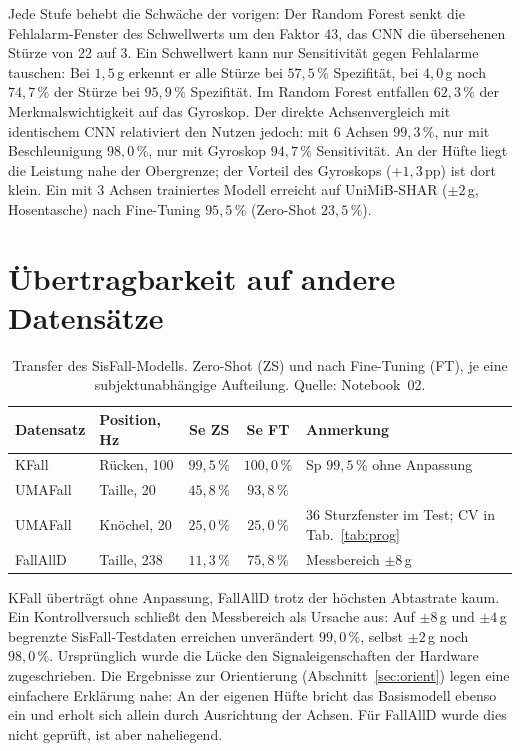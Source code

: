 \documentclass[11pt,a4paper,oneside,parskip=half,open=any,
               numbers=noenddot,listof=totoc,bibliography=totoc]{scrreprt}
\begin{document}
Jede Stufe behebt die Schwäche der vorigen: Der Random Forest senkt die
Fehlalarm-Fenster des Schwellwerts um den Faktor $43$, das CNN die
übersehenen Stürze von 22 auf 3. Ein Schwellwert kann nur Sensitivität
gegen Fehlalarme tauschen: Bei $1{,}5$\,g erkennt er alle Stürze bei
$57{,}5\,\%$ Spezifität, bei $4{,}0$\,g noch $74{,}7\,\%$ der Stürze bei
$95{,}9\,\%$ Spezifität. Im Random Forest entfallen $62{,}3\,\%$ der
Merkmalswichtigkeit auf das Gyroskop. Der direkte Achsenvergleich mit
identischem CNN relativiert den Nutzen jedoch: mit 6 Achsen
$99{,}3\,\%$, nur mit Beschleunigung $98{,}0\,\%$, nur mit Gyroskop
$94{,}7\,\%$ Sensitivität. An der Hüfte liegt die Leistung nahe der
Obergrenze; der Vorteil des Gyroskops ($+1{,}3$\,pp) ist dort klein. Ein
mit 3 Achsen trainiertes Modell erreicht auf UniMiB-SHAR ($\pm 2$\,g,
Hosentasche) nach Fine-Tuning $95{,}5\,\%$ (Zero-Shot $23{,}5\,\%$).

\section{Übertragbarkeit auf andere Datensätze}
\begin{table}[H]
\centering\small
\caption{Transfer des SisFall-Modells. Zero-Shot (ZS) und nach
Fine-Tuning (FT), je eine subjektunabhängige Aufteilung. Quelle: Notebook~02.}
\label{tab:transfer}
\begin{tabularx}{\textwidth}{l l c c Y}
\toprule
\textbf{Datensatz} & \textbf{Position, Hz} & \textbf{Se ZS} & \textbf{Se FT} & \textbf{Anmerkung} \\
\midrule
KFall    & Rücken, 100   & $99{,}5\,\%$  & $100{,}0\,\%$ & Sp $99{,}5\,\%$ ohne Anpassung \\
UMAFall  & Taille, 20    & $45{,}8\,\%$  & $93{,}8\,\%$  & \\
UMAFall  & Knöchel, 20   & $25{,}0\,\%$  & $25{,}0\,\%$  & 36 Sturzfenster im Test; CV in Tab.~\ref{tab:prog} \\
FallAllD & Taille, 238   & $11{,}3\,\%$  & $75{,}8\,\%$  & Messbereich $\pm 8$\,g \\
\bottomrule
\end{tabularx}
\end{table}

KFall überträgt ohne Anpassung, FallAllD trotz der höchsten Abtastrate
kaum. Ein Kontrollversuch schließt den Messbereich als Ursache aus:
Auf $\pm 8$\,g und $\pm 4$\,g begrenzte SisFall-Testdaten erreichen
unverändert $99{,}0\,\%$, selbst $\pm 2$\,g noch $98{,}0\,\%$. Ursprünglich
wurde die Lücke den Signaleigenschaften der Hardware zugeschrieben. Die
Ergebnisse zur Orientierung (Abschnitt~\ref{sec:orient}) legen eine
einfachere Erklärung nahe: An der eigenen Hüfte bricht das Basismodell
ebenso ein und erholt sich allein durch Ausrichtung der Achsen. Für
FallAllD wurde dies nicht geprüft, ist aber naheliegend.
\end{document}
